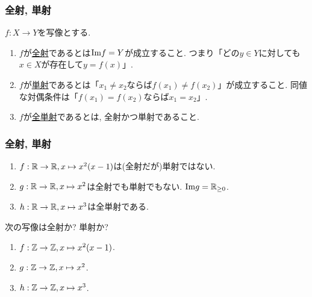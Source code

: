 \begin{frame}
\frametitle{全射, 単射}


\begin{Def}$f:X\rightarrow Y$を写像とする. 
\begin{enumerate}
\item $f$が\underline{全射}であるとは$\mathrm{Im} f = Y$が成立すること. 
つまり「どの$y \in Y$に対しても$x \in X$が存在して$y=f(x)$」. 
\item $f$が\underline{単射}であるとは「$x_1\ne x_2$ならば$f(x_1)\ne f(x_2)$」が成立すること. 
同値な対偶条件は「$f(x_1)= f(x_2)$ならば$x_1= x_2$」.  
\item $f$が\underline{全単射}であるとは, 全射かつ単射であること. 
\end{enumerate}
\end{Def}



\end{frame}



\begin{frame}
\frametitle{全射, 単射}

\begin{Ex}
\begin{enumerate}
\item $f:\mathbb{R} \rightarrow \mathbb{R}, x \mapsto x^2(x-1)$は(全射だが)単射ではない. 
\item $g:\mathbb{R} \rightarrow \mathbb{R}, x \mapsto x^2$は全射でも単射でもない. $\mathrm{Im} g=\mathbb{R}_{\ge 0}$. 
\item $h:\mathbb{R} \rightarrow \mathbb{R}, x \mapsto x^3$は全単射である. 
\end{enumerate}
\end{Ex}


\begin{Prob}
次の写像は全射か? 単射か? 
\begin{enumerate}
\item $f:\mathbb{Z} \rightarrow \mathbb{Z}, x \mapsto x^2(x-1)$.  
\item $g:\mathbb{Z} \rightarrow \mathbb{Z}, x \mapsto x^2$.
\item $h:\mathbb{Z} \rightarrow \mathbb{Z}, x \mapsto x^3$. 
\end{enumerate}
\end{Prob}



\end{frame}



